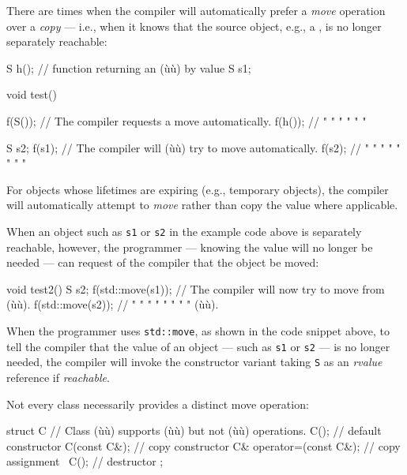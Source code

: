 \noindent There are times when the compiler will automatically prefer a
\emph{move} operation over a \emph{copy} --- i.e., when it knows that
the source object, e.g., a , is no longer separately
reachable:

\begin{emcppslisting}[emcppsbatch=e9]
S h();  // function returning an (ù{}ù) by value
S s1;

void test()
{
    f(S());  // The compiler requests a move automatically.
    f(h());  //  "     "         "    "    "         "

    S s2;
    f(s1);   // The compiler will (ù{}ù) try to move automatically.
    f(s2);   //  "      "      "   "   "   "    "         "
}
\end{emcppslisting}
    

\noindent For objects whose lifetimes are expiring (e.g., temporary objects), the
compiler will automatically attempt to \emph{move} rather than copy the
value where applicable.

When an object such as \lstinline!s1! or \lstinline!s2! in the example code
above is separately reachable, however, the programmer --- knowing the
value will no longer be needed --- can request of the compiler that the
object be moved:

\begin{emcppslisting}[emcppsbatch=e9]
void test2()
{
    S s2;
    f(std::move(s1));   // The compiler will now try to move from (ù{}ù).
    f(std::move(s2));   //  "     "      "    "   "  "    "   "   (ù{}ù).
}
\end{emcppslisting}
    

\noindent When the programmer uses \lstinline!std::move!, as shown in the code
snippet above, to tell the compiler that the value of an object --- such
as \lstinline!s1! or \lstinline!s2! --- is no longer needed, the compiler will
invoke the constructor variant taking \lstinline!S! as an \emph{rvalue}
reference if \emph{reachable}.

Not every class necessarily provides a distinct move operation:

\begin{emcppslisting}[emcppsbatch=e10]
struct C  // Class (ù{}ù) supports (ù{}ù) but not (ù{}ù) operations.
{
    C();                     // default constructor
    C(const C&);             // copy constructor
    C& operator=(const C&);  // copy assignment
    ~C();                    // destructor
};
\end{emcppslisting}
    

